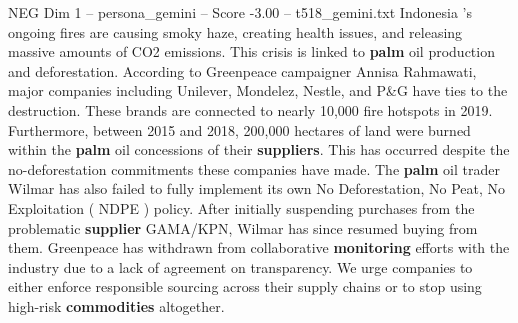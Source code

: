 \begin{textsample}{NEG Dim 1 – persona\_gemini – Score -3.00 – t518\_gemini.txt}  \label{ex:f1_neg_002}
Indonesia 's ongoing fires are causing smoky haze, creating health issues, and releasing massive amounts of CO2 emissions.
This crisis is linked to \textbf{palm} oil production and deforestation.
According to Greenpeace campaigner Annisa Rahmawati, major companies including Unilever, Mondelez, Nestle, and P\&G have ties to the destruction.
These brands are connected to nearly 10,000 fire hotspots in 2019.
Furthermore, between 2015 and 2018, 200,000 hectares of land were burned within the \textbf{palm} oil concessions of their \textbf{suppliers}.
This has occurred despite the no-deforestation commitments these companies have made.
The \textbf{palm} oil trader Wilmar has also failed to fully implement its own No Deforestation, No Peat, No Exploitation ( NDPE ) policy.
After initially suspending purchases from the problematic \textbf{supplier} GAMA/KPN, Wilmar has since resumed buying from them.
Greenpeace has withdrawn from collaborative \textbf{monitoring} efforts with the industry due to a lack of agreement on transparency.
We urge companies to either enforce responsible sourcing across their supply chains or to stop using high-risk \textbf{commodities} altogether.

\end{textsample}
